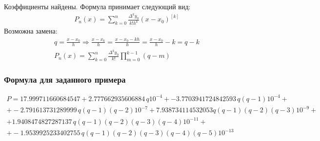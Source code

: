 Коэффициенты найдены. Формула принимает следующий вид:
\begin{align}
	P_n(x) = \sum_{k=0}^n \frac{\Delta^k y_0}{k!h^k} (x-x_0)^{[k]}
\end{align}
Возможна замена:
\begin{align}
	q = \frac{x-x_0}{h} \Longrightarrow \frac{x-x_k}{h} = \frac{x-x_0-kh}{h} = \frac{x-x_0}{h} - k = q - k \\
	P_n(x) = \sum_{k=0}^n \frac{\Delta^k y_0}{k!}\prod_{m=0}^{k-1}(q-m)
\end{align}
\subsubsection{Формула для заданного примера}
\begin{multline}
	P = 17.999711660684547  +   2.777662935606884\, q 10^{-4} + -3.7703941724842593\, q(q - 1) 10^{-4}+ \\
	+ -2.791613731289999\,  q(q - 1)(q - 2) 10^{-7}+ 7.938734114532053 q(q - 1)(q - 2)(q - 3) 10^{-9} + \\
	+ 1.9408474827287137\,  q(q - 1)(q - 2)(q - 3)(q - 4) 10^{-11}+ \\
	+ -1.9539925233402755\,  q(q - 1)(q - 2)(q - 3)(q - 4)(q - 5) 10^{-13}
\end{multline}

